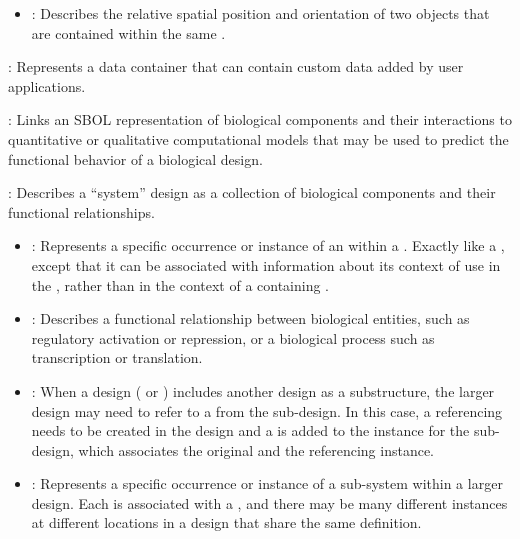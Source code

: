 \begin{description}
\begin{itemize}
\item \emph{}:
Describes the relative spatial position and orientation of two  objects that are contained within the same .
\end{itemize}

\item \emph{}:
Represents a data container that can contain custom data added by user applications.

\item \emph{}:
Links an SBOL representation of biological components and their interactions to quantitative or qualitative computational models that may be used to predict the functional behavior of a biological design.

\item \emph{}:
Describes a ``system'' design as a collection of biological components and their functional relationships.

\begin{itemize}
\item \emph{}:
Represents a specific occurrence or instance of an  within a .
Exactly like a , except that it can be associated with information about its context of use in the , rather than in the context of a containing .

\item \emph{}:
Describes a functional relationship between biological entities, such as regulatory activation or repression, or a biological process such as transcription or translation.

\item \emph{}:
When a design ( or ) includes another design as a substructure, the larger design may need to refer to a  from the sub-design.
In this case, a referencing  needs to be created in the design and a  is added to the instance for the sub-design, which associates the original and the referencing instance.

\item \emph{}:
Represents a specific occurrence or instance of a sub-system within a larger design.
Each  is associated with a , and there may be many different instances at different locations in a design that share the same definition.


\end{itemize}
\end{description}
